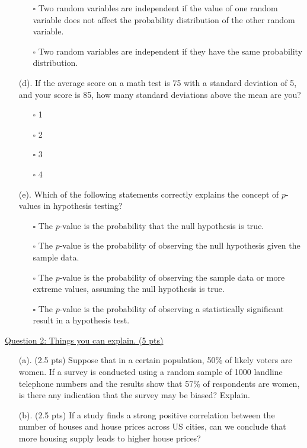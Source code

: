 \documentclass{./../../Latex/tests}
\begin{document}
\begin{enumerate}
\begin{enumerate}
\item[$\square$] Two random variables are independent if the value of one random variable does not affect the probability distribution of the other random variable.
\item[$\square$] Two random variables are independent if they have the same probability distribution. \\
\end{enumerate}
\newpage
\item[(d).] If the average score on a math test is 75 with a standard deviation of 5, and your score is 85, how many standard deviations above the mean are you?
\begin{enumerate}
\item[$\square$] 1
\item[$\square$] 2
\item[$\square$] 3
\item[$\square$] 4 \\
\end{enumerate}

\item[(e).] Which of the following statements correctly explains the concept of $p$-values in hypothesis testing?
\begin{enumerate}
\item[$\square$] The $p$-value is the probability that the null hypothesis is true.
\item[$\square$] The $p$-value is the probability of observing the null hypothesis given the sample data.
\item[$\square$] The $p$-value is the probability of observing the sample data or more extreme values, assuming the null hypothesis is true.
\item[$\square$] The $p$-value is the probability of observing a statistically significant result in a hypothesis test.
\end{enumerate}
\end{enumerate}


\newpage
\underline{Question 2: Things you can explain. (5 pts)}
\begin{enumerate}
\item[(a).] (2.5 pts) Suppose that in a certain population, 50\% of likely voters are women. If a survey is conducted using a random sample of 1000 landline telephone numbers and the results show that 57\% of respondents are women, is there any indication that the survey may be biased? Explain.
\vspace{7.5cm}
\item[(b).] (2.5 pts) If a study finds a strong positive correlation between the number of houses and house prices across US cities, can we conclude that more housing supply leads to higher house prices?
\vspace{7cm}
\end{enumerate}
\end{document}
